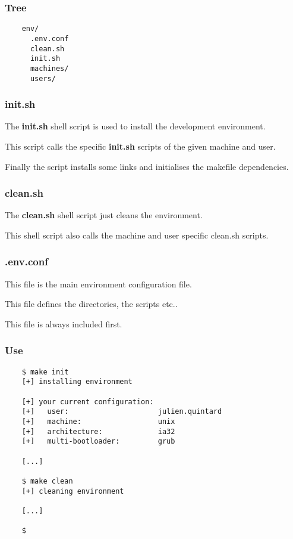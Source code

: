 
\begin{frame}[containsverbatim]
  \frametitle{Tree}

  \begin{verbatim}
    env/
      .env.conf
      clean.sh
      init.sh
      machines/
      users/
  \end{verbatim}
\end{frame}


\begin{frame}
  \frametitle{init.sh}

  The \textbf{init.sh} shell script is used to install the development
  environment.

  \nl

  This script calls the specific \textbf{init.sh} scripts of the given
  machine and user.

  \nl

  Finally the script installs some links and initialises the makefile
  dependencies.
\end{frame}


\begin{frame}
  \frametitle{clean.sh}

  The \textbf{clean.sh} shell script just cleans the environment.

  \nl

  This shell script also calls the machine and user specific clean.sh scripts.
\end{frame}


\begin{frame}
  \frametitle{.env.conf}

  This file is the main environment configuration file.

  \nl

  This file defines the directories, the scripts etc..

  \nl

  This file is always included first.
\end{frame}


\begin{frame}[containsverbatim]
  \frametitle{Use}

  \begin{verbatim}
    $ make init
    [+] installing environment

    [+] your current configuration:
    [+]   user:                     julien.quintard
    [+]   machine:                  unix
    [+]   architecture:             ia32
    [+]   multi-bootloader:         grub

    [...]

    $ make clean
    [+] cleaning environment

    [...]

    $
  \end{verbatim}
\end{frame}

